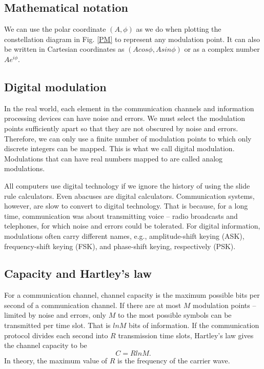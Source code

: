 \documentclass[oneside, letter, 12pt]{book}
\begin{document}
\subsection{Mathematical notation}
We can use the polar coordinate $(A, \phi)$ as we do when plotting the constellation diagram in Fig. \ref{PM} to represent any modulation point. It can also be written in Cartesian coordinates as $(A cos\phi, A sin\phi)$ or as a complex number $A e^{i\phi}$.

\subsection{Digital modulation}
In the real world, each element in the communication channels and information processing devices can have noise and errors. We must select the modulation points sufficiently apart so that they are not obscured by noise and errors. Therefore, we can only use a finite number of modulation points to which only discrete integers can be mapped. This is what we call digital modulation. Modulations that can have real numbers mapped to are called analog modulations.

All computers use digital technology if we ignore the history of using the slide rule calculators. Even abacuses are digital calculators. Communication systems, however, are slow to convert to digital technology. That is because, for a long time, communication was about transmitting voice -- radio broadcasts and telephones, for which noise and errors could be tolerated. For digital information, modulations often carry different names, e.g., amplitude-shift keying (ASK), frequency-shift keying (FSK), and phase-shift keying, respectively (PSK).

\subsection{Capacity and Hartley's law}
For a communication channel, channel capacity is the maximum possible bits per second of a communication channel. If there are at most $M$ modulation points -- limited by noise and errors, only $M$ to the most possible symbols can be transmitted per time slot. That is $ln M$ bits of information. If the communication protocol divides each second into $R$ transmission time slots, Hartley's law gives the channel capacity to be
\begin{equation}
    C = R ln M.
\end{equation}
In theory, the maximum value of $R$ is the frequency of the carrier wave.
\end{document}
